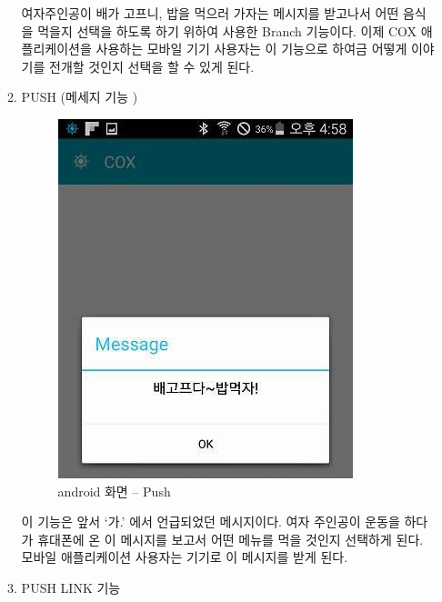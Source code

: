 \documentclass[chapter,oneside]{oblivoir}
\begin{document}
\begin{enumerate}
\begin{enumerate}
        여자주인공이 배가 고프니, 밥을 먹으러 가자는 메시지를 받고나서 어떤 음식을 먹을지 선택을 하도록 하기 위하여 사용한 Branch 기능이다. 이제 COX 애플리케이션을 사용하는 모바일 기기 사용자는 이 기능으로 하여금 어떻게 이야기를 전개할 것인지 선택을 할 수 있게 된다. 

        \item PUSH (메세지 기능 )

        \begin{figure}[h!]
            \centering
        \includegraphics{pic/chp78/img1094}
            \caption{android 화면 – Push}
        \end{figure} 

    이 기능은 앞서 ‘가.’ 에서 언급되었던 메시지이다. 여자 주인공이 운동을 하다가 휴대폰에 온 이 메시지를 보고서 어떤 메뉴를 먹을 것인지 선택하게 된다. 모바일 애플리케이션 사용자는 기기로 이 메시지를 받게 된다.

        \item PUSH LINK 기능
        

\end{enumerate}
\end{enumerate}
\end{document}
